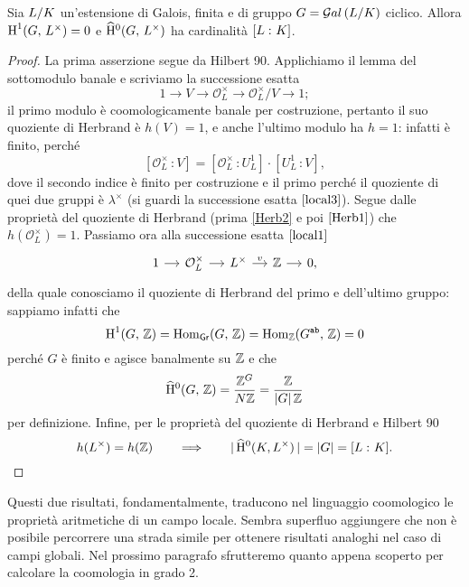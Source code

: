 \begin{theorem} \label{assioma}
	Sia $ L/K $ un'estensione di Galois, finita e di gruppo $ G = \mathcal{G}al\left( L/K \right) $ ciclico. Allora $ \operatorname{H}^1(G, \, L^\times) = 0 $ e $ \operatorname{\widehat{H}^{0}}(G, \, L^\times) $ ha cardinalità $ [L \, \colon K] $.
\end{theorem}
\begin{proof}
	La prima asserzione segue da Hilbert 90. Applichiamo il lemma del sottomodulo banale e scriviamo la successione esatta 
	\[ 1 \to V \to \mathcal{O}_L^\times \to \mathcal{O}_L^\times/V \to 1; \]
	il primo modulo è coomologicamente banale per costruzione, pertanto il suo quoziente di Herbrand è $ h(V) = 1 $, e anche l'ultimo modulo ha $ h = 1 $: infatti è finito, perché $$  [\mathcal{O}_L^\times \, \colon V] = [\mathcal{O}_L^\times \,\colon U_L^1]\cdot[U_L^1 \,\colon V],  $$
	dove il secondo indice è finito per costruzione e il primo perché il quoziente di quei due gruppi è $ \lambda^\times $ (si guardi la successione esatta $ \eqref{local3} $). Segue dalle proprietà del quoziente di Herbrand (prima \ref{Herb2} e poi $ \ref{Herb1} $) che $ h(\mathcal{O}_L^\times) = 1 $. Passiamo ora alla successione esatta $ \eqref{local1} $
	\[ \begin{tikzcd}[column sep = small]
	1 \rar
	& \mathcal{O}_{L}^\times \rar
	& L^\times \rar["v"]
	& \Z \rar
	& 0,
	\end{tikzcd} \]
	della quale conosciamo il quoziente di Herbrand del primo e dell'ultimo gruppo: sappiamo infatti che
	$$  \operatorname{H}^1(G, \, \mathbb{Z}) = \operatorname{Hom}_\mathsf{Gr}(G, \, \mathbb{Z}) = \operatorname{Hom}_{\mathbb{Z}}(G^\texttt{ab}, \, \mathbb{Z}) = 0  $$ perché $ G $ è finito e agisce banalmente su $ \mathbb{Z} $ e che
	$$  \operatorname{\widehat{H}^{0}}(G, \, \mathbb{Z}) = \frac{\mathbb{Z}^G}{ N\mathbb{Z}} = \frac{\mathbb{Z}}{ |G|\, \mathbb{Z}}  $$ per definizione. Infine, per le proprietà del quoziente di Herbrand e Hilbert 90
	\[ h(L^\times) = h(\mathbb{Z}) \qquad\Longrightarrow\qquad |\operatorname{\widehat{H}^{0}}(K, L^\times)\, | = |G| = [L \, \colon K]. \qedhere \]
\end{proof}

Questi due risultati, fondamentalmente, traducono nel linguaggio coomologico le proprietà aritmetiche di un campo locale. Sembra superfluo aggiungere che non è posibile percorrere una strada simile per ottenere risultati analoghi nel caso di campi globali. Nel prossimo paragrafo sfrutteremo quanto appena scoperto per calcolare la coomologia in grado 2.

